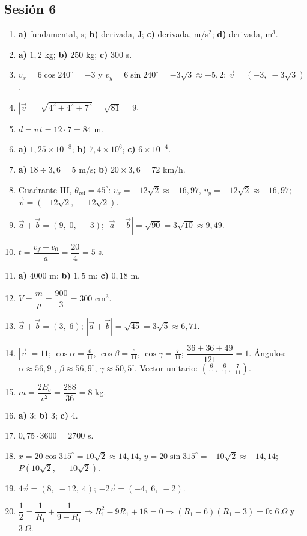 \documentclass[12pt, letterpaper]{article}
\providecommand{\sen}{\sin}
\begin{document}
\subsection*{Sesión 6}
\begin{enumerate}[leftmargin=*, label=\textbf{\arabic*.}]
  \item \textbf{a)} fundamental, s; \textbf{b)} derivada, J; \textbf{c)} derivada, m/s$^2$; \textbf{d)} derivada, m$^3$.
  \item \textbf{a)} $1{,}2$ kg; \textbf{b)} $250$ kg; \textbf{c)} $300$ s.
  \item $v_x=6\cos 240^{\circ}=-3$ y $v_y=6\sen 240^{\circ}=-3\sqrt{3}\approx -5{,}2$; $\vec v=(-3,\; -3\sqrt{3})$.
  \item $|\vec v|=\sqrt{4^2+4^2+7^2}=\sqrt{81}=9$.
  \item $d=v\,t=12\cdot 7=84$ m.
  \item \textbf{a)} $1{,}25 \times 10^{-8}$; \textbf{b)} $7{,}4 \times 10^{6}$; \textbf{c)} $6 \times 10^{-4}$.
  \item \textbf{a)} $18 \div 3{,}6 = 5$ m/s; \quad \textbf{b)} $20 \times 3{,}6 = 72$ km/h.
  \item Cuadrante III, $\theta_{\text{ref}}=45^{\circ}$: $v_x=-12\sqrt{2}\approx -16{,}97$, $v_y=-12\sqrt{2}\approx -16{,}97$; $\vec v=(-12\sqrt{2},\; -12\sqrt{2})$.
  \item $\vec a+\vec b=(9,\; 0,\; -3)$; $|\vec a+\vec b|=\sqrt{90}=3\sqrt{10}\approx 9{,}49$.
  \item $t=\dfrac{v_f-v_0}{a}=\dfrac{20}{4}=5$ s.
  \item \textbf{a)} $4000$ m; \textbf{b)} $1{,}5$ m; \textbf{c)} $0{,}18$ m.
  \item $V=\dfrac{m}{\rho}=\dfrac{900}{3}=300$ cm$^3$.
  \item $\vec a+\vec b=(3,\; 6)$; $|\vec a+\vec b|=\sqrt{45}=3\sqrt{5}\approx 6{,}71$.
  \item $|\vec v|=11$; $\cos\alpha=\frac{6}{11}$, $\cos\beta=\frac{6}{11}$, $\cos\gamma=\frac{7}{11}$; $\dfrac{36+36+49}{121}=1$. \checkmark\quad Ángulos: $\alpha\approx 56{,}9^{\circ}$, $\beta\approx 56{,}9^{\circ}$, $\gamma\approx 50{,}5^{\circ}$. Vector unitario: $(\frac{6}{11},\; \frac{6}{11},\; \frac{7}{11})$.
  \item $m=\dfrac{2E_c}{v^2}=\dfrac{288}{36}=8$ kg.
  \item \textbf{a)} 3; \quad \textbf{b)} 3; \quad \textbf{c)} 4.
  \item $0{,}75\cdot 3600=2700$ s.
  \item $x=20\cos 315^{\circ}=10\sqrt{2}\approx 14{,}14$, $y=20\sen 315^{\circ}=-10\sqrt{2}\approx -14{,}14$; $P(10\sqrt{2},\; -10\sqrt{2})$.
  \item $4\vec v=(8,\; -12,\; 4)$; $-2\vec v=(-4,\; 6,\; -2)$.
  \item $\dfrac{1}{2}=\dfrac{1}{R_1}+\dfrac{1}{9-R_1}\Rightarrow R_1^2-9R_1+18=0\Rightarrow(R_1-6)(R_1-3)=0$: $6\ \Omega$ y $3\ \Omega$.
\end{enumerate}
\end{document}
